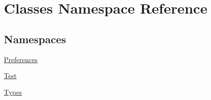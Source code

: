 \hypertarget{namespace_classes}{}\section{Classes Namespace Reference}
\label{namespace_classes}
\subsection*{Namespaces}
\begin{DoxyCompactItemize}
\item 
 \hyperlink{namespace_classes_1_1_preferences}{Preferences}
\item 
 \hyperlink{namespace_classes_1_1_test}{Test}
\item 
 \hyperlink{namespace_classes_1_1_types}{Types}
\end{DoxyCompactItemize}
